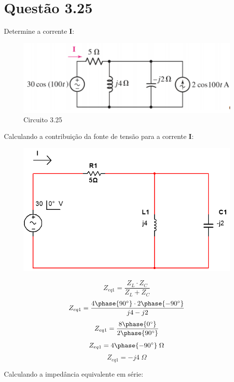 \documentclass[
	12pt,				%
	oneside,			%
	a4paper,			%
	english,			%
	french,				%
	spanish,			%
	brazil				%
	]{abntex2}
\begin{document}

\section*{Questão 3.25}

Determine a corrente $\textbf{I}$:

\begin{figure}[htb]
	\centering
	\includegraphics[scale=0.8]{25.PNG}
	\caption{Circuito 3.25}
\end{figure}

Calculando a contribuição da fonte de tensão para a corrente $\textbf{I}$:

\begin{figure}[htb]
	\centering
	\includegraphics[scale=0.4]{25_1.PNG}
\end{figure}

$$Z_{eq1} = \dfrac{Z_L\cdot Z_C}{Z_L + Z_C}$$
$$Z_{eq1} = \dfrac{4\phase{90^{\circ}}\cdot 2\phase{-90^{\circ}}}{j4 - j2}$$
$$Z_{eq1} = \dfrac{8\phase{0^{\circ}}}{2\phase{90^{\circ}}}$$
$$Z_{eq1} = 4\phase{-90^{\circ}}\;\Omega$$
$$Z_{eq1} = -j4\;\Omega$$

Calculando a impedância equivalente em série:
\end{document}
